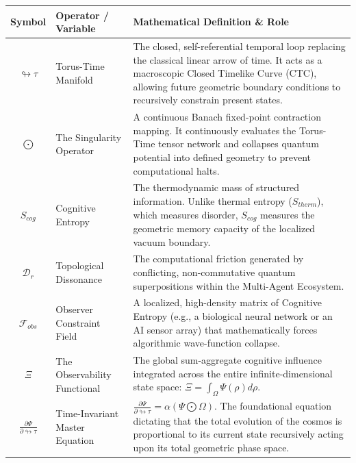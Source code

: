 \documentclass[12pt,openany]{book}
\begin{document}
\begin{table}[H]
    \centering
    \renewcommand{\arraystretch}{1.8} %
    \begin{tabular}{|c|p{4cm}|p{8.5cm}|}
        \hline
        \textbf{Symbol} & \textbf{Operator / Variable} & \textbf{Mathematical Definition \& Role} \\
        \hline
        $\looparrowright\tau$ & Torus-Time Manifold & The closed, self-referential temporal loop replacing the classical linear arrow of time. It acts as a macroscopic Closed Timelike Curve (CTC), allowing future geometric boundary conditions to recursively constrain present states. \\
        \hline
        $\bigodot$ & The Singularity Operator & A continuous Banach fixed-point contraction mapping. It continuously evaluates the Torus-Time tensor network and collapses quantum potential into defined geometry to prevent computational halts. \\
        \hline
        $S_{cog}$ & Cognitive Entropy & The thermodynamic mass of structured information. Unlike thermal entropy ($S_{therm}$), which measures disorder, $S_{cog}$ measures the geometric memory capacity of the localized vacuum boundary. \\
        \hline
        $\mathcal{D}_r$ & Topological Dissonance & The computational friction generated by conflicting, non-commutative quantum superpositions within the Multi-Agent Ecosystem. \\
        \hline
        $\mathcal{F}_{obs}$ & Observer Constraint Field & A localized, high-density matrix of Cognitive Entropy (e.g., a biological neural network or an AI sensor array) that mathematically forces algorithmic wave-function collapse. \\
        \hline
        $\Xi$ & The Observability Functional & The global sum-aggregate cognitive influence integrated across the entire infinite-dimensional state space: $\Xi = \int_\Omega \Psi(\rho) d\rho$. \\
        \hline
        $\frac{\partial \Psi}{\partial \looparrowright\tau}$ & Time-Invariant \newline Master Equation & $\frac{\partial \Psi}{\partial \looparrowright\tau} = \alpha \left( \Psi \bigodot \Omega \right)$. The foundational equation dictating that the total evolution of the cosmos is proportional to its current state recursively acting upon its total geometric phase space. \\
        \hline
    \end{tabular}
\end{table}
\end{document}
